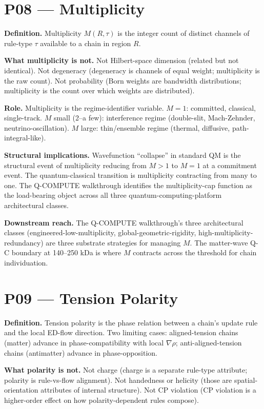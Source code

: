 \documentclass[11pt,a4paper]{article}
\begin{document}
\section{P08 --- Multiplicity}

\textbf{Definition.} Multiplicity $M(R, \tau)$ is the integer count of distinct channels of rule-type $\tau$ available to a chain in region $R$.

\textbf{What multiplicity is not.} Not Hilbert-space dimension (related but not identical). Not degeneracy (degeneracy is channels of equal weight; multiplicity is the raw count). Not probability (Born weights are bandwidth distributions; multiplicity is the count over which weights are distributed).

\textbf{Role.} Multiplicity is the regime-identifier variable. $M = 1$: committed, classical, single-track. $M$ small (2--a few): interference regime (double-slit, Mach-Zehnder, neutrino-oscillation). $M$ large: thin/ensemble regime (thermal, diffusive, path-integral-like).

\textbf{Structural implications.} Wavefunction ``collapse'' in standard QM is the structural event of multiplicity reducing from $M > 1$ to $M = 1$ at a commitment event. The quantum-classical transition is multiplicity contracting from many to one. The Q-COMPUTE walkthrough identifies the multiplicity-cap function as the load-bearing object across all three quantum-computing-platform architectural classes.

\textbf{Downstream reach.} The Q-COMPUTE walkthrough's three architectural classes (engineered-low-multiplicity, global-geometric-rigidity, high-multiplicity-redundancy) are three substrate strategies for managing $M$. The matter-wave Q-C boundary at 140--250 kDa is where $M$ contracts across the threshold for chain individuation.

\section{P09 --- Tension Polarity}

\textbf{Definition.} Tension polarity is the phase relation between a chain's update rule and the local ED-flow direction. Two limiting cases: aligned-tension chains (matter) advance in phase-compatibility with local $\nabla\rho$; anti-aligned-tension chains (antimatter) advance in phase-opposition.

\textbf{What polarity is not.} Not charge (charge is a separate rule-type attribute; polarity is rule-vs-flow alignment). Not handedness or helicity (those are spatial-orientation attributes of internal structure). Not CP violation (CP violation is a higher-order effect on how polarity-dependent rules compose).
\end{document}

